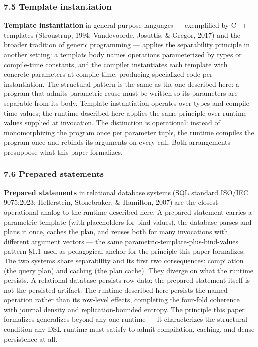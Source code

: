 \documentclass[
]{article}
\begin{document}
\subsubsection{7.5 Template instantiation}\label{template-instantiation}

\textbf{Template instantiation} in general-purpose languages ---
exemplified by C++ templates (Stroustrup, 1994; Vandevoorde, Josuttis,
\& Gregor, 2017) and the broader tradition of generic programming ---
applies the separability principle in another setting: a template body
names operations parameterized by types or compile-time constants, and
the compiler instantiates each template with concrete parameters at
compile time, producing specialized code per instantiation. The
structural pattern is the same as the one described here: a program that
admits parametric reuse must be written so its parameters are separable
from its body. Template instantiation operates over types and
compile-time values; the runtime described here applies the same
principle over runtime values supplied at invocation. The distinction is
operational: instead of monomorphizing the program once per parameter
tuple, the runtime compiles the program once and rebinds its arguments
on every call. Both arrangements presuppose what this paper formalizes.

\subsubsection{7.6 Prepared statements}\label{prepared-statements}

\textbf{Prepared statements} in relational database systems (SQL
standard ISO/IEC 9075:2023; Hellerstein, Stonebraker, \& Hamilton, 2007)
are the closest operational analog to the runtime described here. A
prepared statement carries a parametric template (with placeholders for
bind values), the database parses and plans it once, caches the plan,
and reuses both for many invocations with different argument vectors ---
the same parametric-template-plus-bind-values pattern §1.1 used as
pedagogical anchor for the principle this paper formalizes. The two
systems share separability and its first two consequences: compilation
(the query plan) and caching (the plan cache). They diverge on what the
runtime persists. A relational database persists row data; the prepared
statement itself is not the persisted artifact. The runtime described
here persists the named operation rather than its row-level effects,
completing the four-fold coherence with journal density and
replication-bounded entropy. The principle this paper formalizes
generalizes beyond any one runtime --- it characterizes the structural
condition any DSL runtime must satisfy to admit compilation, caching,
and dense persistence at all.
\end{document}

